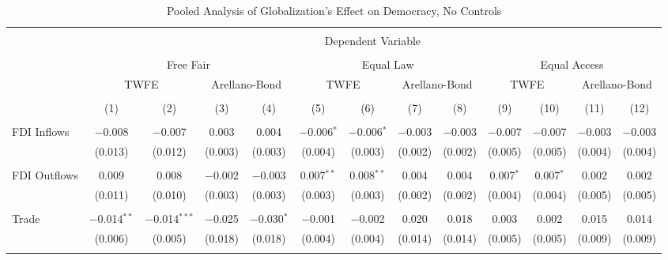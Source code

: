 
\begin{table} \centering 
  \caption{Pooled Analysis of Globalization's Effect on Democracy, No Controls} 
  \label{} 
\small 
\begin{tabular}{@{\extracolsep{2pt}}lcccccccccccc} 
\\[-1.8ex]\hline 
\hline \\[-1.8ex] 
 & \multicolumn{12}{c}{Dependent Variable} \\ 
\cline{2-13} 
\\[-1.8ex] & \multicolumn{4}{c}{Free Fair} & \multicolumn{4}{c}{Equal Law} & \multicolumn{4}{c}{Equal Access} \\ 
 & \multicolumn{2}{c}{TWFE} & \multicolumn{2}{c}{Arellano-Bond} & \multicolumn{2}{c}{TWFE} & \multicolumn{2}{c}{Arellano-Bond} & \multicolumn{2}{c}{TWFE} & \multicolumn{2}{c}{Arellano-Bond} \\ 
\\[-1.8ex] & (1) & (2) & (3) & (4) & (5) & (6) & (7) & (8) & (9) & (10) & (11) & (12)\\ 
\hline \\[-1.8ex] 
 FDI Inflows & $-$0.008 & $-$0.007 & 0.003 & 0.004 & $-$0.006$^{*}$ & $-$0.006$^{*}$ & $-$0.003 & $-$0.003 & $-$0.007 & $-$0.007 & $-$0.003 & $-$0.003 \\ 
  & (0.013) & (0.012) & (0.003) & (0.003) & (0.004) & (0.003) & (0.002) & (0.002) & (0.005) & (0.005) & (0.004) & (0.004) \\ 
  & & & & & & & & & & & & \\ 
 FDI Outflows & 0.009 & 0.008 & $-$0.002 & $-$0.003 & 0.007$^{**}$ & 0.008$^{**}$ & 0.004 & 0.004 & 0.007$^{*}$ & 0.007$^{*}$ & 0.002 & 0.002 \\ 
  & (0.011) & (0.010) & (0.003) & (0.003) & (0.003) & (0.003) & (0.002) & (0.002) & (0.004) & (0.004) & (0.005) & (0.005) \\ 
  & & & & & & & & & & & & \\ 
 Trade & $-$0.014$^{**}$ & $-$0.014$^{***}$ & $-$0.025 & $-$0.030$^{*}$ & $-$0.001 & $-$0.002 & 0.020 & 0.018 & 0.003 & 0.002 & 0.015 & 0.014 \\ 
  & (0.006) & (0.005) & (0.018) & (0.018) & (0.004) & (0.004) & (0.014) & (0.014) & (0.005) & (0.005) & (0.009) & (0.009) \\ 
  & & & & & & & & & & & & \\ 

\end{tabular}
\end{table}
